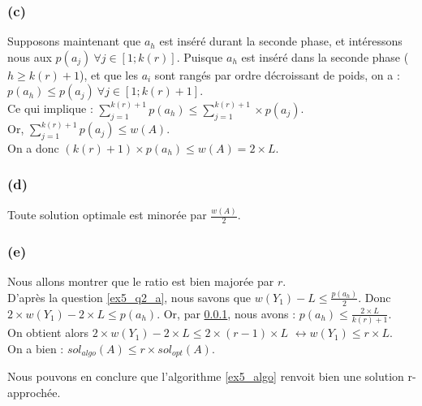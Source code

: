 \subsubsection{(c)}\label{ex5_q2_c}
Supposons maintenant que $a_h$ est inséré durant la seconde phase, et intéressons nous aux 
$p(a_j)\ \forall j \in [1;k(r)]$. 
Puisque $a_h$ est inséré dans la seconde phase ($h \geq k(r)+1$), et que les $a_i$ sont
rangés par ordre décroissant de poids, on a : $p(a_h) \leq p(a_j)\ \forall j \in [1;k(r)+1]$.\\
Ce qui implique : $\sum_{j = 1}^{k(r)+1}p(a_h) \leq \sum_{j = 1}^{k(r)+1} \times p(a_j)$.\\
Or, $\sum_{j=1}^{k(r)+1}p(a_j) \leq w(A)$. \\
On a donc $(k(r)+1) \times p(a_h) \leq w(A) = 2 \times L$.

\subsubsection{(d)}\label{ex5_q2_d}
Toute solution optimale est minorée par $\frac{w(A)}{2}$.

\subsubsection{(e)}\label{ex5_q2_e}
Nous allons montrer que le ratio est bien majorée par $r$.\\
D'après la question \ref{ex5_q2_a}, nous savons que $w(Y_1) - L \leq \frac{p(a_h)}{2}$.
Donc $2 \times w(Y_1) - 2 \times L \leq p(a_h)$.
Or, par \ref{ex5_q2_c}, nous avons : $p(a_h) \leq \frac{2\times L}{k(r)+1}$.\\
On obtient alors $2 \times w(Y_1) - 2 \times L \leq 2 \times (r - 1) \times L$
$\leftrightarrow w(Y_1) \leq r \times L$.\\
On a bien : $sol_{algo}(A) \leq r \times sol_{opt}(A)$.

Nous pouvons en conclure que l'algorithme \ref{ex5_algo} renvoit bien une solution
r-approchée.


